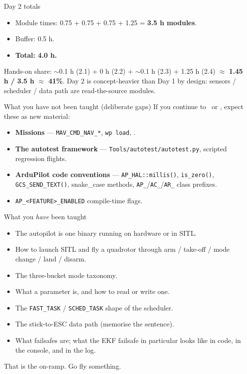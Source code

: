 \documentclass[aspectratio=169,11pt]{beamer}
\begin{document}
\begin{frame}{Day 2 totals}
  \begin{itemize}
    \item Module times: 0.75 + 0.75 + 0.75 + 1.25 = \textbf{3.5 h modules}.
    \item Buffer: 0.5 h.
    \item \textbf{Total: 4.0 h.}
  \end{itemize}
  Hands-on share: $\sim$0.1 h (2.1) + 0 h (2.2) + $\sim$0.1 h (2.3) + 1.25 h (2.4) $\approx$ \textbf{1.45 h / 3.5 h $\approx$ 41\%}.
  \vfill
  Day 2 is concept-heavier than Day 1 by design: sensors / scheduler / data path are read-the-source modules.
\end{frame}

\begin{frame}{What you have not been taught (deliberate gaps)}
  If you continue to \siblingquadplane\ or \siblingplane, expect these as new material:
  \begin{itemize}
    \item \textbf{Missions} --- \texttt{MAV\_CMD\_NAV\_*}, \texttt{wp load}, .
    \item \textbf{The autotest framework} --- \texttt{Tools/autotest/autotest.py}, scripted regression flights.
    \item \textbf{ArduPilot code conventions} --- \texttt{AP\_HAL::millis()}, \texttt{is\_zero()}, \texttt{GCS\_SEND\_TEXT()}, snake\_case methods, \texttt{AP\_}/\texttt{AC\_}/\texttt{AR\_} class prefixes.
    \item \texttt{AP\_<FEATURE>\_ENABLED} compile-time flags.
  \end{itemize}
\end{frame}

\begin{frame}{What you \emph{have} been taught}
  \begin{itemize}
    \item The autopilot is one binary running on hardware or in SITL.
    \item How to launch SITL and fly a quadrotor through arm / take-off / mode change / land / disarm.
    \item The three-bucket mode taxonomy.
    \item What a parameter is, and how to read or write one.
    \item The \texttt{FAST\_TASK} / \texttt{SCHED\_TASK} shape of the scheduler.
    \item The stick-to-ESC data path (memorise the sentence).
    \item What failsafes are; what the EKF failsafe in particular looks like in code, in the console, and in the log.
  \end{itemize}
  \vfill
  \begin{center}\large That is the on-ramp. Go fly something.\end{center}
\end{frame}
\end{document}
